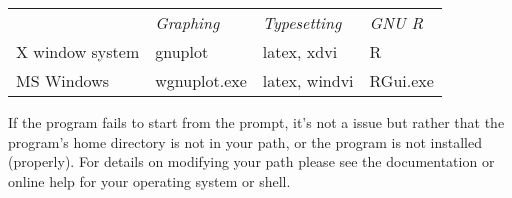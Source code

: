 \begin{center}
  \begin{tabular}{llll}
    & \textit{Graphing} & \textit{Typesetting} & \textit{GNU R}\\
    X window system & gnuplot & latex, xdvi & R\\
    MS Windows & wgnuplot.exe & latex, windvi & RGui.exe\\
  \end{tabular}
\end{center}

If the program fails to start from the prompt, it's not a 
issue but rather that the program's home directory is not in your
path, or the program is not installed (properly).  For details on
modifying your path please see the documentation or online help for
your operating system or shell.
    

